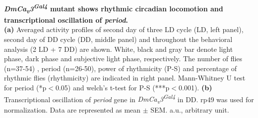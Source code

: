 \label{fig:4}
\textbf{ \emph{DmCa\textsubscript{v}3\textsuperscript{Gal4}} mutant shows rhythmic circadian locomotion and transcriptional oscillation of \emph{period}.}
\\
\textbf{(a)} Averaged activity profiles of second day of three LD cycle (LD, left panel), second day of DD cycle (DD, middle panel) and throughout the behavioral analysis (2 LD + 7 DD) are shown.
White, black and gray bar denote light phase, dark phase and subjective light phase, respectively.
The number of flies (n=37-54) , period (n=26-50), power of rhythmicity (P-S) and percentage of rhythmic flies (rhythmicity) are indicated in right panel.
Mann-Whitney U test for period (*p$<$0.05) and welch's t-test for P-S (***p$<$0.001). 
\textbf{(b)} Transcriptional oscillation of \emph{period} gene in  \emph{DmCa\textsubscript{v}3\textsuperscript{Gal4}} in DD. rp49 was used for normalization.
Data are represented as mean $\pm$ SEM.
a.u., arbitrary unit.
  
  
  
  
  